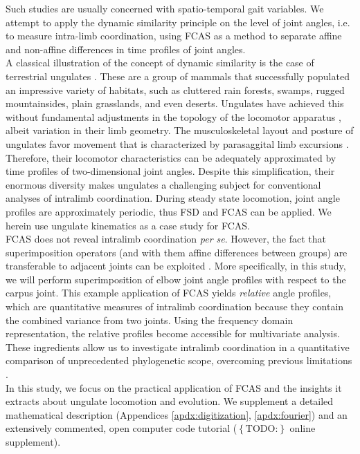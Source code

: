 \documentclass[10pt, a4paper]{article}
\newcommand{\todo}[1]{\colorbox{terracotta!30!yellow}{\footnotesize{$\left\lbrace\text{TODO:}\right\rbrace$ }#1\normalsize}}
\begin{document}
\begin{linenumbers}[1]
Such studies are usually concerned with spatio-temporal gait variables. 
We attempt to apply the dynamic similarity principle on the level of joint angles, i.e. to measure intra-limb coordination, using FCAS as a method to separate affine and non-affine differences in time profiles of joint angles. 
\\A classical illustration of the concept of dynamic similarity is the case of terrestrial ungulates \citep{Alexander1983}. 
These are a group of mammals that successfully populated an impressive variety of habitats, such as cluttered rain forests, swamps, rugged mountainsides, plain grasslands, and even deserts. 
Ungulates have achieved this without fundamental adjustments in the topology of the locomotor apparatus \citep{McMahon1975,Alexander1984}, albeit variation in their limb geometry. 
The musculoskeletal layout and posture of ungulates favor movement that is characterized by parasaggital limb excursions \citep[][]{Jenkins1971,Stein1997}. 
Therefore, their locomotor characteristics can be adequately approximated by time profiles of two-dimensional joint angles. 
Despite this simplification, their enormous diversity makes ungulates a challenging subject for conventional analyses of intralimb coordination. 
During steady state locomotion, joint angle profiles are approximately periodic, thus FSD and FCAS can be applied. 
We herein use ungulate kinematics as a case study for FCAS.
\\FCAS does not reveal intralimb coordination \textit{per se}. 
However, the fact that superimposition operators (and with them affine differences between groups) are transferable to adjacent joints can be exploited \citep[analogous to][]{Mielke2018}. 
More specifically, in this study, we will perform superimposition of elbow joint angle profiles with respect to the carpus joint. 
This example application of FCAS yields \textit{relative} angle profiles, which are quantitative measures of intralimb coordination because they contain the combined variance from two joints. 
Using the frequency domain representation, the relative profiles become accessible for multivariate analysis. 
These ingredients allow us to investigate intralimb coordination in a quantitative comparison of unprecedented phylogenetic scope, overcoming previous limitations \citep{Gatesy2011}. 
\\In this study, we focus on the practical application of FCAS and the insights it extracts about ungulate locomotion and evolution. 
We supplement a detailed mathematical description (Appendices \ref{apdx:digitization}, \ref{apdx:fourier}) and an extensively commented, open computer code tutorial (\todo{online supplement}). 

\end{linenumbers}
\end{document}
